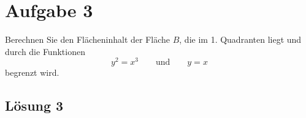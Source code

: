 \documentclass[main.tex]{subfiles}
\begin{document}
\section{Aufgabe 3}
Berechnen Sie den Flächeninhalt der Fläche $B$, die im 1.
Quadranten liegt und durch die Funktionen
\[
y^2 = x^3
\qquad \mbox{und} \qquad
y = x
\]
begrenzt wird.

\subsection{Lösung 3}
\end{document}

